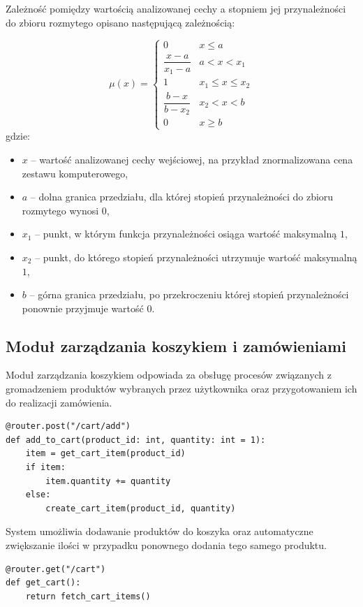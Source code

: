 \documentclass[a4paper,twoside,12pt]{book}
\begin{document}
Zależność pomiędzy wartością analizowanej cechy a stopniem jej przynależności do
zbioru rozmytego opisano następującą zależnością:

\[
\mu(x)=
\begin{cases}
0 & x \le a \\
\dfrac{x-a}{x_1-a} & a < x < x_1 \\
1 & x_1 \le x \le x_2 \\
\dfrac{b-x}{b-x_2} & x_2 < x < b \\
0 & x \ge b
\end{cases}
\]
gdzie:
\begin{itemize}
    \item $x$ – wartość analizowanej cechy wejściowej, na przykład znormalizowana
    cena zestawu komputerowego,
    \item $a$ – dolna granica przedziału, dla której stopień przynależności do
    zbioru rozmytego wynosi $0$,
    \item $x_1$ – punkt, w którym funkcja przynależności osiąga wartość maksymalną
    $1$,
    \item $x_2$ – punkt, do którego stopień przynależności utrzymuje wartość
    maksymalną $1$,
    \item $b$ – górna granica przedziału, po przekroczeniu której stopień
    przynależności ponownie przyjmuje wartość $0$.
\end{itemize}
\subsection{Moduł zarządzania koszykiem i zamówieniami}

Moduł zarządzania koszykiem odpowiada za obsługę procesów związanych z
gromadzeniem produktów wybranych przez użytkownika oraz przygotowaniem ich do
realizacji zamówienia.

\begin{verbatim}
@router.post("/cart/add")
def add_to_cart(product_id: int, quantity: int = 1):
    item = get_cart_item(product_id)
    if item:
        item.quantity += quantity
    else:
        create_cart_item(product_id, quantity)
\end{verbatim}

System umożliwia dodawanie produktów do koszyka oraz automatyczne zwiększanie
ilości w przypadku ponownego dodania tego samego produktu.

\begin{verbatim}
@router.get("/cart")
def get_cart():
    return fetch_cart_items()
\end{verbatim}
\end{document}
